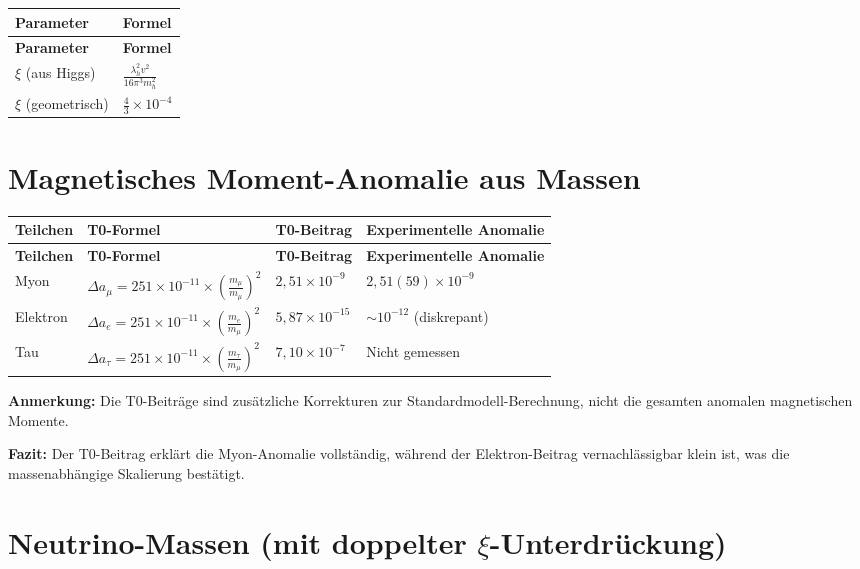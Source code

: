 \documentclass[12pt,a4paper]{article}
\begin{document}
	\begin{longtable}{|p{3cm}|p{5cm}|}
		\hline
		\textbf{Parameter} & \textbf{Formel} \\
		\hline
		\endfirsthead
		\hline
		\textbf{Parameter} & \textbf{Formel} \\
		\hline
		\endhead
		\(\xi\) (aus Higgs) & \(\frac{\lambda_h^{2}v^{2}}{16\pi^{3}m_h^{2}}\) \\
		\hline
		\(\xi\) (geometrisch) & \(\frac{4}{3} \times 10^{-4}\) \\
		\hline
	\end{longtable}
	
\section{Magnetisches Moment-Anomalie aus Massen}

\begin{longtable}{|p{2.5cm}|p{4.5cm}|p{4cm}|p{3cm}|}
	\hline
	\textbf{Teilchen} & \textbf{T0-Formel} & \textbf{T0-Beitrag} & \textbf{Experimentelle Anomalie} \\
	\hline
	\endfirsthead
	\hline
	\textbf{Teilchen} & \textbf{T0-Formel} & \textbf{T0-Beitrag} & \textbf{Experimentelle Anomalie} \\
	\hline
	\endhead
	
	Myon & $\Delta a_{\mu} = 251 \times 10^{-11} \times \left(\frac{m_{\mu}}{m_{\mu}}\right)^{2}$ & $2{,}51 \times 10^{-9}$ & $2{,}51(59) \times 10^{-9}$ \\
	\hline
	
	Elektron & $\Delta a_{e} = 251 \times 10^{-11} \times \left(\frac{m_{e}}{m_{\mu}}\right)^{2}$ & $5{,}87 \times 10^{-15}$ & $\sim 10^{-12}$ (diskrepant) \\
	\hline
	
	Tau & $\Delta a_{\tau} = 251 \times 10^{-11} \times \left(\frac{m_{\tau}}{m_{\mu}}\right)^{2}$ & $7{,}10 \times 10^{-7}$ & Nicht gemessen \\
	\hline
\end{longtable}

\textbf{Anmerkung:} Die T0-Beiträge sind zusätzliche Korrekturen zur Standardmodell-Berechnung, nicht die gesamten anomalen magnetischen Momente.

\textbf{Fazit:} Der T0-Beitrag erklärt die Myon-Anomalie vollständig, während der Elektron-Beitrag vernachlässigbar klein ist, was die massenabhängige Skalierung bestätigt.
	\section{Neutrino-Massen (mit doppelter \(\xi\)-Unterdrückung)}
	
\end{document}
